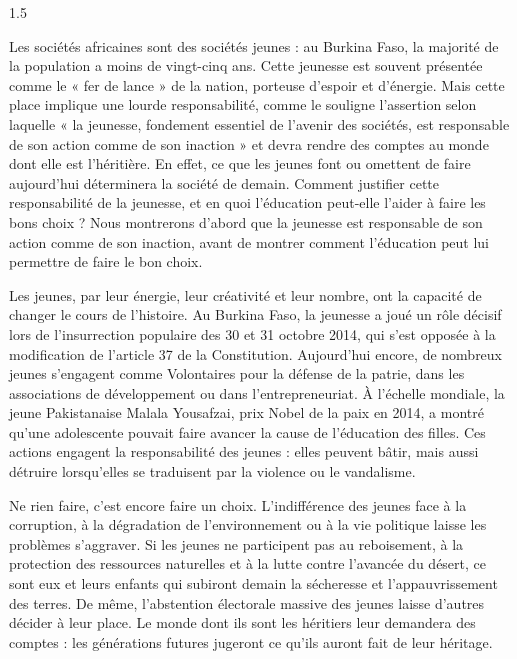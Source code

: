\documentclass[12pt]{article}
\begin{document}
\begin{spacing}{1.5}


Les sociétés africaines sont des sociétés jeunes : au Burkina Faso, la majorité de la population a moins de vingt-cinq ans. Cette jeunesse est souvent présentée comme le « fer de lance » de la nation, porteuse d'espoir et d'énergie. Mais cette place implique une lourde responsabilité, comme le souligne l'assertion selon laquelle « la jeunesse, fondement essentiel de l'avenir des sociétés, est responsable de son action comme de son inaction » et devra rendre des comptes au monde dont elle est l'héritière. En effet, ce que les jeunes font ou omettent de faire aujourd'hui déterminera la société de demain. Comment justifier cette responsabilité de la jeunesse, et en quoi l'éducation peut-elle l'aider à faire les bons choix ? Nous montrerons d'abord que la jeunesse est responsable de son action comme de son inaction, avant de montrer comment l'éducation peut lui permettre de faire le bon choix.


Les jeunes, par leur énergie, leur créativité et leur nombre, ont la capacité de changer le cours de l'histoire. Au Burkina Faso, la jeunesse a joué un rôle décisif lors de l'insurrection populaire des 30 et 31 octobre 2014, qui s'est opposée à la modification de l'article 37 de la Constitution. Aujourd'hui encore, de nombreux jeunes s'engagent comme Volontaires pour la défense de la patrie, dans les associations de développement ou dans l'entrepreneuriat. À l'échelle mondiale, la jeune Pakistanaise Malala Yousafzai, prix Nobel de la paix en 2014, a montré qu'une adolescente pouvait faire avancer la cause de l'éducation des filles. Ces actions engagent la responsabilité des jeunes : elles peuvent bâtir, mais aussi détruire lorsqu'elles se traduisent par la violence ou le vandalisme.

Ne rien faire, c'est encore faire un choix. L'indifférence des jeunes face à la corruption, à la dégradation de l'environnement ou à la vie politique laisse les problèmes s'aggraver. Si les jeunes ne participent pas au reboisement, à la protection des ressources naturelles et à la lutte contre l'avancée du désert, ce sont eux et leurs enfants qui subiront demain la sécheresse et l'appauvrissement des terres. De même, l'abstention électorale massive des jeunes laisse d'autres décider à leur place. Le monde dont ils sont les héritiers leur demandera des comptes : les générations futures jugeront ce qu'ils auront fait de leur héritage.


\end{spacing}
\end{document}
